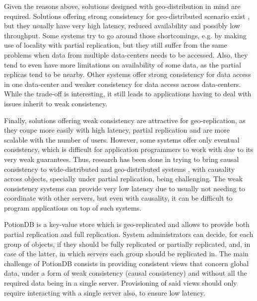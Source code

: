 Given the reasons above, solutions designed with geo-distribution in mind are required.
Solutions offering strong consistency for geo-distributed scenario exist \cite{???}, but they usually have very high latency, reduced availability and possibly low throughput.
Some systems try to go around those shortcomings, e.g. by making use of locality with partial replication, but they still suffer from the same problems when data from multiple data-centers needs to be accessed.
Also, they tend to even have more limitations on availability of some data, as the partial replicas tend to be nearby.
Other systems offer strong consistency for data access in one data-center and weaker consistency for data access across data-centers.
While the trade-off is interesting, it still leads to applications having to deal with issues inherit to weak consistency.

Finally, solutions offering weak consistency are attractive for geo-replication, as they coupe more easily with high latency, partial replication and are more scalable with the number of users.
However, some systems offer only eventual consistency, which is difficult for application programmers to work with due to its very weak guarantees.
Thus, research has been done in trying to bring causal consistency to wide-distributed and geo-distributed systems \cite{???}, with causality across objects, specially under partial replication, being challenging.
The weak consistency systems can provide very low latency due to usually not needing to coordinate with other servers, but even with causality, it can be difficult to program applications on top of such systems. %


PotionDB is a key-value store which is geo-replicated and allows to provide both partial replication and full replication.
System administrators can decide, for each group of objects, if they should be fully replicated or partially replicated, and, in case of the latter, in which servers each group should be replicated in.
The main challenge of PotionDB consists in providing consistent views that concern global data, under a form of weak consistency (causal consistency) and without all the required data being in a single server.
Provisioning of said views should only require interacting with a single server also, to ensure low latency.

